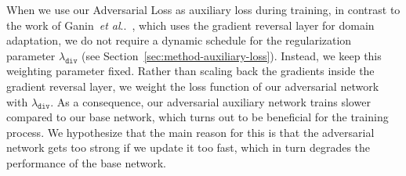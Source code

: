 \documentclass[10pt,journal,compsoc]{IEEEtran}
\makeatletter
\DeclareRobustCommand\onedot{\futurelet\@let@token\@onedot}
\def\@onedot{\ifx\@let@token.\else.\null\fi\xspace}
\def\etal{\emph{et al}\onedot}
\makeatother
\begin{document}
When we use our Adversarial Loss as auxiliary loss during training, in contrast to the work of Ganin~\etal~\cite{ganin2016domain}, which uses the
gradient reversal layer for domain adaptation, we do not require a dynamic schedule
for the regularization parameter $\lambda_{\texttt{div}}$ (see Section~\ref{sec:method-auxiliary-loss}). Instead, we keep
this weighting parameter fixed. Rather than scaling back the gradients
inside the gradient reversal layer, we weight the loss function of our adversarial
network with $\lambda_{\texttt{div}}$.  As a consequence, our adversarial
auxiliary network trains slower compared to our base network, which turns out to be beneficial for the training process. We hypothesize that the main reason for this is that the
adversarial network gets too strong if we update it too fast, which in turn
degrades the performance of the base network.
\end{document}
